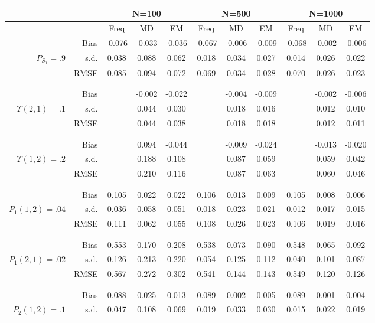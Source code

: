\begin{tabular}{rr@{\hskip .3in}ccc@{\hskip .4in}ccc@{\hskip .4in}ccc}
\hline
& &  \multicolumn{3}{c}{N=100}&\multicolumn{3}{c}{N=500}&\multicolumn{3}{c}{N=1000} \\
\hline
&   &Freq & MD & EM &Freq & MD & EM &Freq & MD & EM \\
\hline
&Bias & -0.076&-0.033&-0.036&-0.067&-0.006&-0.009&-0.068&-0.002&-0.006 \\
$ P_{S_{1}}=.9 $& s.d. & 0.038&0.088&0.062&0.018&0.034&0.027&0.014&0.026&0.022 \\
&RMSE & 0.085&0.094&0.072&0.069&0.034&0.028&0.070&0.026&0.023 \\
\\\\&Bias & &-0.002&-0.022&&-0.004&-0.009&&-0.002&-0.006 \\
$ \Upsilon(2,1)=.1 $& s.d. & &0.044&0.030&&0.018&0.016&&0.012&0.010 \\
&RMSE & &0.044&0.038&&0.018&0.018&&0.012&0.011 \\
\\\\&Bias & &0.094&-0.044&&-0.009&-0.024&&-0.013&-0.020 \\
$ \Upsilon(1,2)=.2 $& s.d. & &0.188&0.108&&0.087&0.059&&0.059&0.042 \\
&RMSE & &0.210&0.116&&0.087&0.063&&0.060&0.046 \\
\\\\&Bias & 0.105&0.022&0.022&0.106&0.013&0.009&0.105&0.008&0.006 \\
$ P_{1}(1,2)=.04 $& s.d. & 0.036&0.058&0.051&0.018&0.023&0.021&0.012&0.017&0.015 \\
&RMSE & 0.111&0.062&0.055&0.108&0.026&0.023&0.106&0.019&0.016 \\
\\\\&Bias & 0.553&0.170&0.208&0.538&0.073&0.090&0.548&0.065&0.092 \\
$ P_{1}(2,1)=.02 $& s.d. & 0.126&0.213&0.220&0.054&0.125&0.112&0.040&0.101&0.087 \\
&RMSE & 0.567&0.272&0.302&0.541&0.144&0.143&0.549&0.120&0.126 \\
\\\\&Bias & 0.088&0.025&0.013&0.089&0.002&0.005&0.089&0.001&0.004 \\
$ P_{2}(1,2)=.1 $& s.d. & 0.047&0.108&0.069&0.019&0.033&0.030&0.015&0.022&0.019 \\

\end{tabular}
